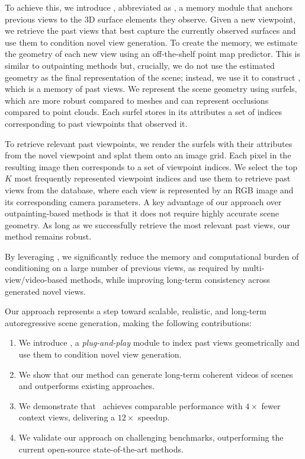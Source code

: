 To achieve this, we introduce \textit{\mnamel}, abbreviated as \textit{\mname}, a memory module that anchors previous views to the 3D surface elements they observe.
Given a new viewpoint, we retrieve the past views that best capture the currently observed surfaces and use them to condition novel view generation.
To create the memory, we estimate the geometry of each new view using an off-the-shelf point map predictor.
This is similar to outpainting methods but, crucially, we do not use the estimated geometry as the final representation of the scene;
instead, we use it to construct \mname{}, which is a memory of past views.
We represent the scene geometry using surfels, which are more robust compared to meshes and can represent occlusions compared to point clouds.
Each surfel stores in its attributes a set of indices corresponding to past viewpoints that observed it.

To retrieve relevant past viewpoints, we render the surfels with their attributes from the novel viewpoint and splat them onto an image grid.
Each pixel in the resulting image then corresponds to a set of viewpoint indices.
We select the top $K$ most frequently represented viewpoint indices and use them to retrieve past views from the database, where each view is represented by an RGB image and its corresponding camera parameters.
A key advantage of our approach over outpainting-based methods is that it does not require highly accurate scene geometry.
As long as we successfully retrieve the most relevant past views, our method remains robust.

By leveraging \textit{\mnamel}, we significantly reduce the memory and computational burden of conditioning on a large number of previous views, as required by multi-view/video-based methods, while improving long-term consistency across generated novel views.

Our approach represents a step toward scalable, realistic, and long-term autoregressive scene generation, making the following contributions:
\begin{enumerate}
    \item We introduce \mnamel, a \textit{plug-and-play} module to index past views geometrically and use them to condition novel view generation.
    \item We show that our method can generate long-term coherent videos of scenes and outperforms existing approaches.
    \item We demonstrate that \mnamel~achieves comparable performance with $4\times$ fewer context views, delivering a $12\times$ speedup.
    \item We validate our approach on challenging benchmarks, outperforming the current open-source state-of-the-art methods.
\end{enumerate}
